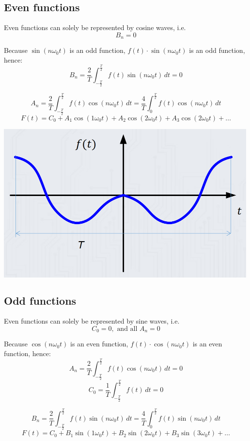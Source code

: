 \documentclass[11pt]{article}
\begin{document}
 \newpage
\subsection{Even functions}
\label{sec:org80a8e81}
Even functions can solely be represented by cosine waves, i.e.
\[B_n = 0\]

Because \(\sin (n \omega_0 t)\) is an odd function, \(f(t) \cdot \sin(n \omega_0 t)\) is an odd function, hence:
\[B_n = \frac{2}{T} \int_{-\frac{T}{2}}^{\frac{T}{2}} f(t) \sin (n \omega_0 t) \, dt = 0\]

\[A_n = \frac{2}{T} \int_{-\frac{T}{2}}^{\frac{T}{2}} f(t) \cos (n \omega_0 t) \, dt = \frac{4}{T} \int_0^{\frac{T}{2}} f(t) \cos (n \omega_0 t) \, dt\]
\[F(t) = C_0 + A_1 \cos (1 \omega_0 t) + A_2 \cos (2 \omega_0 t) + A_3 \cos (2 \omega_0 t) + \ldots\]

\begin{center}
\includegraphics[width=.9\linewidth]{./images/even-function-fourier-series-representation.png}
\end{center}

 \newpage
\subsection{Odd functions}
\label{sec:orge6c6c21}
Even functions can solely be represented by sine waves, i.e.
\[C_0 = 0, \text{ and all } A_n = 0\]

Because \(\cos (n \omega_0 t)\) is an even function, \(f(t) \cdot \cos (n \omega_0 t)\) is an even function, hence:
\[A_n = \frac{2}{T} \int_{-\frac{T}{2}}^{\frac{T}{2}} f(t) \cos (n \omega_0 t) \, dt = 0\]
  \[C_0 = \frac{1}{T} \int_{-\frac{T}{2}}^{\frac{T}{2}} f(t) \, dt = 0\]

\[B_n = \frac{2}{T} \int_{-\frac{T}{2}}^{\frac{T}{2}} f(t) \sin (n \omega_0 t) \, dt = \frac{4}{T} \int_0^{\frac{T}{2}} f(t) \sin (n \omega_0 t) \, dt\]
\[F(t) = C_0 + B_1 \sin (1 \omega_0 t) + B_2 \sin (2 \omega_0 t) + B_3 \sin (3 \omega_0 t) + \ldots\]
\end{document}
